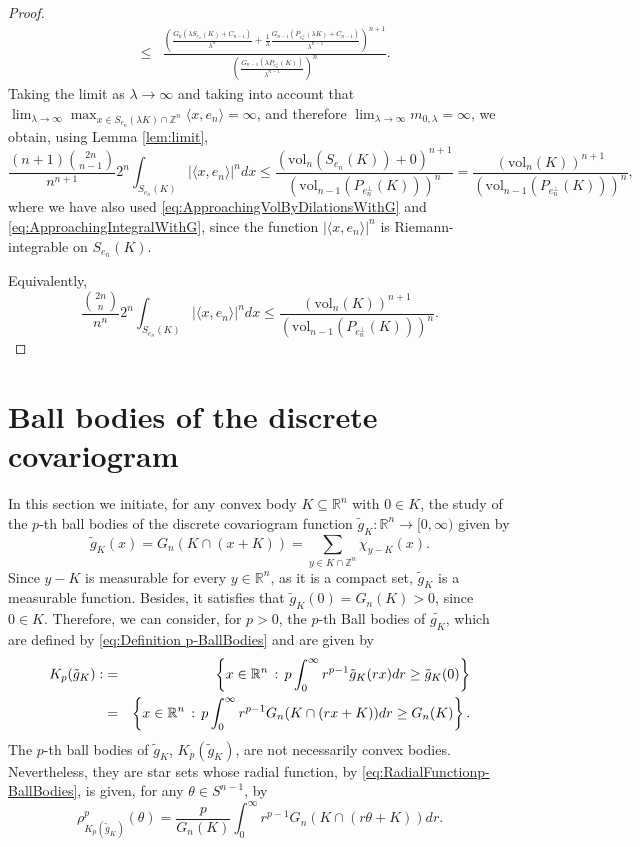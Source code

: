 \documentclass[10pt]{amsart}
\def\R{\mathbb{R}}
\def\Z{\mathbb{Z}}
\def\vol{\mathrm{vol}}
\numberwithin{equation}{section}
\begin{document}
\begin{proof}
\begin{eqnarray*}
&\leq&\frac{\left(\frac{G_n(\lambda S_{e_n}(K)+C_{n-1})}{\lambda^n}+\frac{1}{\lambda}\frac{G_{n-1}(P_{e_n^\perp}(\lambda K)+C_{n-1})}{\lambda^{n-1}}\right)^{n+1}}{\left(\frac{G_{n-1}(\lambda P_{e_n^\perp}(K))}{\lambda^{n-1}}\right)^n}.
\end{eqnarray*}
Taking the limit as $\lambda\to\infty$  and taking into account that $\displaystyle{\lim_{\lambda\to\infty}\max_{x\in S_{e_n}(\lambda K)\cap\Z^n}\langle x,e_n\rangle=\infty}$, and therefore $\displaystyle{\lim_{\lambda\to\infty}m_{0,\lambda}=\infty}$, we obtain, using Lemma \ref{lem:limit},
$$
\frac{(n+1){{2n}\choose{n-1}}}{n^{n+1}}2^n\int_{S_{e_n}(K)}|\langle x,e_n\rangle|^ndx\leq\frac{(\vol_n(S_{e_n}(K))+0)^{n+1}}{(\vol_{n-1}(P_{e_n^\perp}(K)))^n}=\frac{(\vol_n(K))^{n+1}}{(\vol_{n-1}(P_{e_n^\perp}(K)))^n},
$$
where we have also used \eqref{eq:ApproachingVolByDilationsWithG} and \eqref{eq:ApproachingIntegralWithG}, since the function $|\langle x,e_n\rangle|^n$ is Riemann-integrable on $S_{e_n}(K)$.

Equivalently,
$$
\frac{{{2n}\choose{n}}}{n^n}2^n\int_{S_{e_n}(K)}|\langle x,e_n\rangle|^ndx\leq\frac{(\vol_n(K))^{n+1}}{(\vol_{n-1}(P_{e_n^\perp}(K)))^n}.
$$
\end{proof}
\section{Ball bodies of the discrete covariogram}\label{sec:BallBodies}

In this section we initiate, for any convex body $K\subseteq\R^n$ with $0\in K$, the study of the $p$-th ball bodies of the discrete covariogram function $\tilde{g}_K:\R^n\to[0,\infty)$ given by
\begin{equation}\label{eq:tilegAndCharacteristicFunctions}
\tilde{g}_K(x)=G_n(K\cap(x+K))=\sum_{y\in K\cap\Z^n}\chi_{y-K}(x).
\end{equation}
Since $y-K$ is measurable for every $y\in\R^n$, as it is a compact set, $\tilde{g}_K$ is a measurable function. Besides, it satisfies that $\tilde{g}_K(0)=G_n(K)>0$, since $0\in K$. Therefore, we can consider, for $p>0$, the $p$-th Ball bodies of $\tilde{g_K}$, which are defined by \eqref{eq:Definition p-BallBodies} and are given by
\begin{eqnarray*}
K_p(\tilde{g}_K):&=&\left\{x\in\R^n\,:\,p\int_0^\infty r^{p-1}\tilde{g}_K(rx)dr\geq \tilde{g}_K(0)\right\}\cr
&=&\left\{x\in\R^n\,:\,p\int_0^\infty r^{p-1}G_n(K\cap(rx+K))dr\geq G_n(K)\right\}.
\end{eqnarray*}
The $p$-th ball bodies of $\tilde{g}_K$, $K_p(\tilde{g}_K)$, are not necessarily convex bodies. Nevertheless, they are star sets whose radial function, by \eqref{eq:RadialFunctionp-BallBodies}, is given, for any $\theta\in S^{n-1}$, by
$$
\rho_{K_p(\tilde{g}_K)}^p(\theta)=\frac{p}{G_n(K)}\int_0^\infty r^{p-1}G_n(K\cap(r\theta+K))dr.
$$
\end{document}
